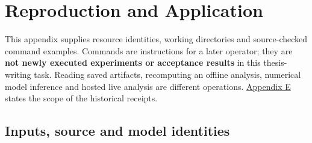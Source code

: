 \chapter{Reproduction and Application}\label{s:98e28a8e40011105}

This appendix supplies resource identities, working directories and
source-checked command examples. Commands are instructions for a later
operator; they are \textbf{not newly executed experiments or acceptance results}
in this thesis-writing task. Reading saved artifacts, recomputing an
offline analysis, numerical model inference and hosted live analysis are
different operations. \hyperref[s:8356fa5ade54dd36]{Appendix E}
states the scope of the historical receipts.

\section{Inputs, source and model identities}\label{s:93a159a4cb07aed1}

\begingroup
\small
{}
\setlength{\tabcolsep}{3pt}

